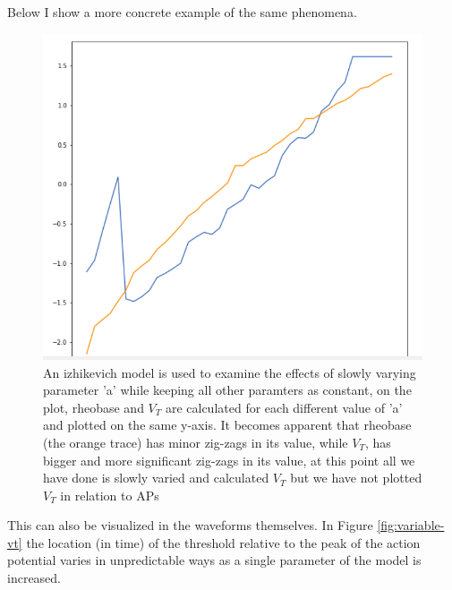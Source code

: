 Below I show a more concrete example of the same phenomena.
\begin{figure}
\begin{center}
\includegraphics[]{figures/rh_vs_vt.png}
\caption[ADD SHORT CAPTION]{An izhikevich model is used to examine the effects of slowly varying parameter 'a' while keeping all other paramters as constant, on the plot, rheobase and $V_{T}$ are calculated for each different value of 'a' and plotted on the same y-axis. It becomes apparent that rheobase (the orange trace) has minor zig-zags in its value, while $V_{T}$, has bigger and more significant zig-zags in its value, at this point all we have done is slowly varied and calculated $V_{T}$ but we have not plotted $V_{T}$ in relation to APs}
\label{fig:corrugation-cause-2}
\end{center}
\end{figure}

This can also be visualized in the waveforms themselves.
In Figure \ref{fig:variable-vt} the location (in time) of the threshold relative to the peak of the action potential varies in unpredictable ways as a single parameter of the model is increased.

